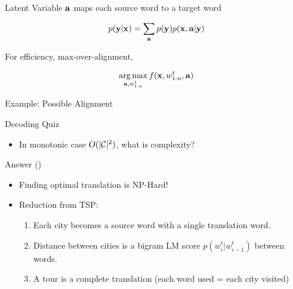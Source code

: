 \documentclass{beamer}
\begin{document}
\begin{frame}{Latent Variable}
  $\mathbf{a}$ maps each source word to a target word
\end{frame}

\begin{frame}{}
  \[ p(\mathbf{y} | \mathbf{x}) = \sum_{\mathbf{a}} p(\mathbf{y}) p(\mathbf{x}, \mathbf{a} | \mathbf{y})  \]  

  For efficiency, max-over-alignment,

  \[ \argmax_{\bolda, w^t_{1:n}} f(\boldx, w^t_{1:n}, \bolda)\]

\end{frame}

\begin{frame}{Example: Possible Alignment}
\begin{center}  
\end{center}  
\end{frame}



\begin{frame}{Decoding Quiz}
  \begin{itemize}
  \item In monotonic case $O(|\mathcal{C}|^2)$, what is complexity?
  \end{itemize}
\end{frame}

\begin{frame}{Answer ()}
  \begin{itemize}
  \item Finding optimal translation is NP-Hard!
    \air 
  \item Reduction from TSP:
    \begin{enumerate}
    \item Each city becomes a source word with a single translation word.
    \item Distance between cities is a bigram LM score $p(w^t_i | w^t_{i-1})$ between words.
    \item A tour is a complete translation (each word used = each city visited)
    \end{enumerate}
  \end{itemize}
\end{frame}
\end{document}
